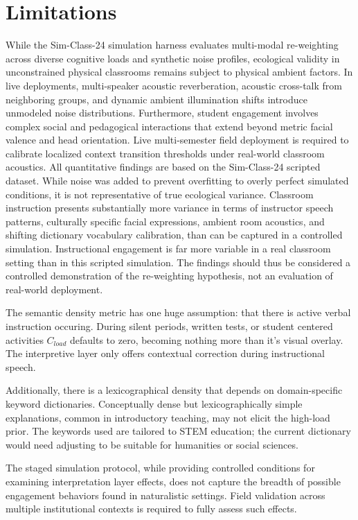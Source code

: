 \documentclass[conference]{IEEEtran}
\begin{document}
\section{Limitations}
While the Sim-Class-24 simulation harness evaluates multi-modal re-weighting across diverse cognitive loads and synthetic noise profiles, ecological validity in unconstrained physical classrooms remains subject to physical ambient factors. In live deployments, multi-speaker acoustic reverberation, acoustic cross-talk from neighboring groups, and dynamic ambient illumination shifts introduce unmodeled noise distributions. Furthermore, student engagement involves complex social and pedagogical interactions that extend beyond metric facial valence and head orientation. Live multi-semester field deployment is required to calibrate localized context transition thresholds under real-world classroom acoustics.
All quantitative findings are based on the Sim-Class-24 scripted dataset. While noise was added to prevent overfitting to overly perfect simulated conditions, it is not representative of true ecological variance. Classroom instruction presents substantially more variance in terms of instructor speech patterns, culturally specific facial expressions, ambient room acoustics, and shifting dictionary vocabulary calibration, than can be captured in a controlled simulation. Instructional engagement is far more variable in a real classroom setting than in this scripted simulation. The findings should thus be considered a controlled demonstration of the re-weighting hypothesis, not an evaluation of real-world deployment.

The semantic density metric has one huge assumption: that there is active verbal instruction occuring. During silent periods, written tests, or student centered activities $C_{load}$ defaults to zero, becoming nothing more than it’s visual overlay. The interpretive layer only offers contextual correction during instructional speech.

Additionally, there is a lexicographical density that depends on domain-specific keyword dictionaries. Conceptually dense but lexicographically simple explanations, common in introductory teaching, may not elicit the high-load prior. The keywords used are tailored to STEM education; the current dictionary would need adjusting to be suitable for humanities or social sciences.

The staged simulation protocol, while providing controlled conditions for examining interpretation layer effects, does not capture the breadth of possible engagement behaviors found in naturalistic settings. Field validation across multiple institutional contexts is required to fully assess such effects.
\end{document}
